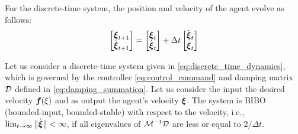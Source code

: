 For the discrete-time system, the position and velocity of the agent evolve as follows:
\begin{equation}
	\begin{bmatrix}
	 \vecs \xi_{t+1} \\ \dot{\vecs \xi}_{t+1}
	\end{bmatrix}
	=
	\begin{bmatrix}
	 \vecs \xi_{t} \\ \dot{\vecs \xi}_{t}
	\end{bmatrix}
	+ 
	\Delta t 
	\begin{bmatrix}
		\dot{\vecs \xi}_{t} \\ \ddot{\vecs \xi}_t 
	\end{bmatrix}
	\label{eq:discrete_time_dynamics}
\end{equation}

\begin{lemma}
	Let us consider a discrete-time system given in \eqref{eq:discrete_time_dynamics}, which is governed by the controller \eqref{eq:control_command} and damping matrix $\mathcal{D}$ defined in \eqref{eq:damping_summation}.
	Let us consider the input the desired velocity $\boldsymbol{f}(\xi)$ and as output the agent's velocity $\dot{\boldsymbol{\xi}}$. 
	The system is BIBO (bounded-input, bounded-stable) with respect to the velocity, i.e., $\lim_{t \rightarrow \infty} \| \dot{\boldsymbol{\xi}} \| < \infty$, if all eigenvalues of $\mathcal{M}^{-1} \mathcal{D}$ are less or equal to $2 / \Delta t$.
\end{lemma}


